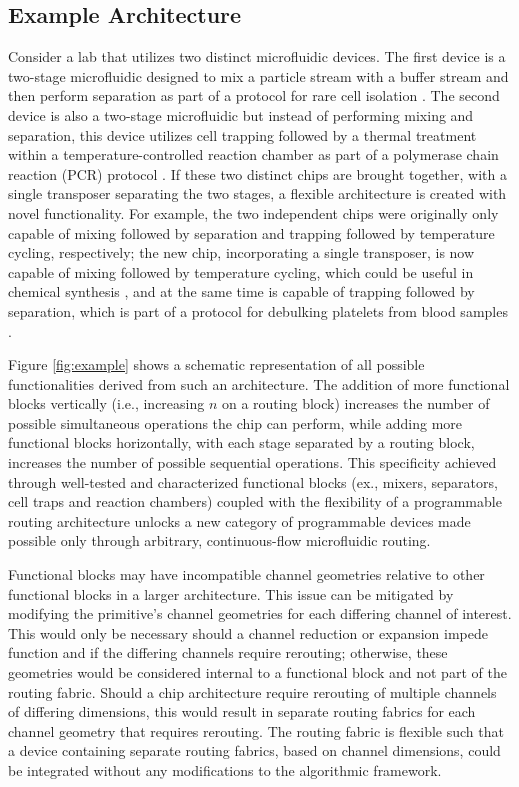 \subsection{Example Architecture}
\label{sec:example}
Consider a lab that utilizes two distinct microfluidic devices. The first device is a two-stage microfluidic designed to mix a particle stream with a buffer stream and then perform separation as part of a protocol for rare cell isolation \cite{pamme2007continuous}. The second device is also a two-stage microfluidic but instead of performing mixing and separation, this device utilizes cell trapping followed by a thermal treatment within a temperature-controlled reaction chamber as part of a polymerase chain reaction (PCR) protocol \cite{zhang2006pcr}. If these two distinct chips are brought together, with a single transposer separating the two stages, a flexible architecture is created with novel functionality. For example, the two independent chips were originally only capable of mixing followed by separation and trapping followed by temperature cycling, respectively; the new chip, incorporating a single transposer, is now capable of mixing followed by temperature cycling, which could be useful in chemical synthesis \cite{jensen2014tools}, and at the same time is capable of trapping followed by separation, which is part of a protocol for debulking platelets from blood samples \cite{shields2015microfluidic}.

	Figure \ref{fig:example} shows a schematic representation of all possible functionalities derived from such an architecture. The addition of more functional blocks vertically (i.e., increasing $n$ on a routing block) increases the number of possible simultaneous operations the chip can perform, while adding more functional blocks horizontally, with each stage separated by a routing block, increases the number of possible sequential operations. This specificity achieved through well-tested and characterized functional blocks (ex., mixers, separators, cell traps and reaction chambers) coupled with the flexibility of a programmable routing architecture unlocks a new category of programmable devices made possible only through arbitrary, continuous-flow microfluidic routing. 


Functional blocks may have incompatible channel geometries relative to other functional blocks in a larger architecture. This issue can be mitigated by modifying the primitive's channel geometries for each differing channel of interest. This would only be necessary should a channel reduction or expansion impede function and if the differing channels require rerouting; otherwise, these geometries would be considered internal to a functional block and not part of the routing fabric. Should a chip architecture require rerouting of multiple channels of differing dimensions, this would result in separate routing fabrics for each channel geometry that requires rerouting. The routing fabric is flexible such that a device containing separate routing fabrics, based on channel dimensions, could be integrated without any modifications to the algorithmic framework.

